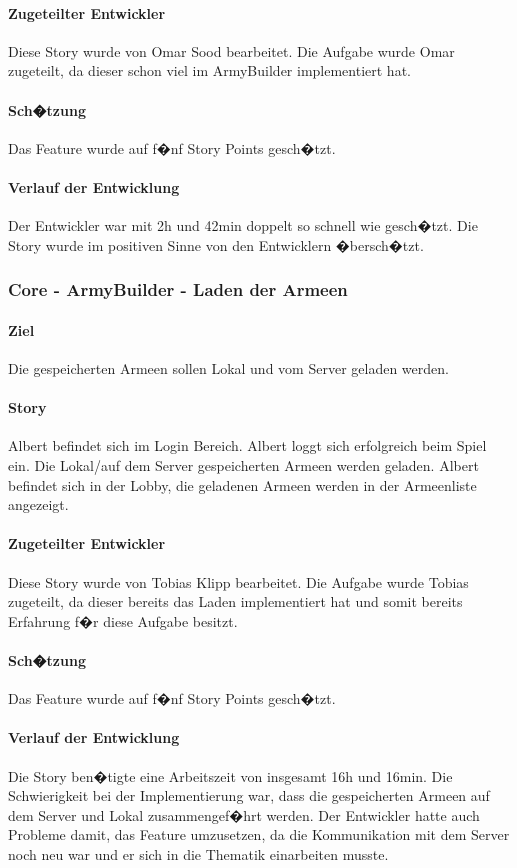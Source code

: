 \documentclass[12pt, titlepage]{scrartcl}
\begin{document}
			\paragraph{Zugeteilter Entwickler} Diese Story wurde von Omar Sood bearbeitet. Die Aufgabe wurde Omar zugeteilt, da dieser schon viel im ArmyBuilder implementiert hat.
			\paragraph{Sch�tzung}
			Das Feature wurde auf f�nf Story Points gesch�tzt.
			\paragraph{Verlauf der Entwicklung} 
			Der Entwickler war mit 2h und 42min doppelt so schnell wie gesch�tzt. Die Story wurde im positiven Sinne von den Entwicklern �bersch�tzt.
			\subsubsection{Core - ArmyBuilder - Laden der Armeen}
			\paragraph{Ziel} Die gespeicherten Armeen sollen Lokal und vom Server geladen werden.
			\paragraph{Story} Albert befindet sich im Login Bereich. Albert loggt sich erfolgreich beim Spiel ein. Die Lokal/auf dem Server gespeicherten Armeen werden geladen. Albert befindet sich in der Lobby, die geladenen Armeen werden in der Armeenliste angezeigt.
			\paragraph{Zugeteilter Entwickler} Diese Story wurde von Tobias Klipp bearbeitet. Die Aufgabe wurde Tobias zugeteilt, da dieser bereits das Laden implementiert hat und somit bereits Erfahrung f�r diese Aufgabe besitzt.
			\paragraph{Sch�tzung}
			Das Feature wurde auf f�nf Story Points gesch�tzt.
			\paragraph{Verlauf der Entwicklung} 
			Die Story ben�tigte eine Arbeitszeit von insgesamt 16h und 16min. Die Schwierigkeit bei der Implementierung war, dass die gespeicherten Armeen auf dem Server und Lokal zusammengef�hrt werden. Der Entwickler hatte auch Probleme damit, das Feature umzusetzen, da die Kommunikation mit dem Server noch neu war und er sich in die Thematik einarbeiten musste.
\end{document}
